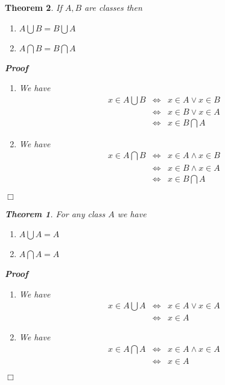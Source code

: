 \documentclass{book}
\newenvironment{proof}{\noindent\textbf{Proof\ }}{\hspace*{\fill}$\Box$\medskip}
\newtheorem{theorem}{Theorem}
\begin{document}
{{\begin{theorem}
  \label{commutative laws of union and intersection}If $A, B$ are classes then
  \begin{enumerate}
    \item $A \bigcup B = B \bigcup A$
    
    \item $A \bigcap B = B \bigcap A$
  \end{enumerate}
  \begin{proof}
    
    \begin{enumerate}
      \item We have
      \begin{eqnarray*}
        x \in A \bigcup B & \Leftrightarrow & x \in A \vee x \in B\\
        & \Leftrightarrow & x \in B \vee x \in A\\
        & \Leftrightarrow & x \in B \bigcap A
      \end{eqnarray*}
      \item We have
      \begin{eqnarray*}
        x \in A \bigcap B & \Leftrightarrow & x \in A \wedge x \in B\\
        & \Leftrightarrow & x \in B \wedge x \in A\\
        & \Leftrightarrow & x \in B \bigcap A
      \end{eqnarray*}
    \end{enumerate}
  \end{proof}
  
  \begin{theorem}
    \label{idempotent laws}For any class $A$ we have
    \begin{enumerate}
      \item $A \bigcup A = A$
      
      \item $A \bigcap A = A$
    \end{enumerate}
  \end{theorem}
  
  \begin{proof}
    
    \begin{enumerate}
      \item We have
      \begin{eqnarray*}
        x \in A \bigcup A & \Leftrightarrow & x \in A \vee x \in A\\
        & \Leftrightarrow & x \in A
      \end{eqnarray*}
      \item We have
      \begin{eqnarray*}
        x \in A \bigcap A & \Leftrightarrow & x \in A \wedge x \in A\\
        & \Leftrightarrow & x \in A
      \end{eqnarray*}
    \end{enumerate}
  \end{proof}
  

\end{theorem}}}
\end{document}
